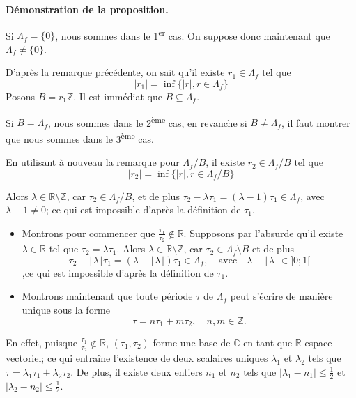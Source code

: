\documentclass{article}
\begin{document}
\textbf{Démonstration de la proposition.}

Si \( \Lambda_f = \{0\} \), nous sommes dans le 1\textsuperscript{er} cas. On suppose donc maintenant que \( \Lambda_f \neq \{0\} \).

D'après la remarque précédente, on sait qu'il existe \( r_1 \in \Lambda_f \) tel que
\[
|r_1| = \inf\{|r|, r \in \Lambda_f\}
\]
Posons \( B = r_1\mathbb{Z} \). Il est immédiat que \( B \subseteq \Lambda_f \).

Si \( B = \Lambda_f \), nous sommes dans le 2\textsuperscript{ème} cas, en revanche si \( B \neq \Lambda_f \), il faut montrer que nous sommes dans le 3\textsuperscript{ème} cas.

En utilisant à nouveau la remarque pour \( \Lambda_f/B \), il existe \( r_2 \in \Lambda_f/B \) tel que
\[
|r_2| = \inf\{|r|, r \in \Lambda_f/B\}
\]

Alors \( \lambda \in \mathbb{R}\setminus\mathbb{Z} \), car \( \tau_2 \in \Lambda_f/B \), et de plus \( \tau_2 - \lambda\tau_1 = (\lambda - 1)\tau_1 \in \Lambda_f \), avec \( \lambda - 1 \neq 0 \); ce qui est impossible d'après la définition de \( \tau_1 \).
\begin{itemize}
    \item Montrons pour commencer que \( \frac{\tau_1}{\tau_2} \notin \mathbb{R} \). Supposons par l'absurde qu'il existe \( \lambda \in \mathbb{R} \) tel que \( \tau_2 = \lambda\tau_1 \).
    Alors \( \lambda \in \mathbb{R} \setminus \mathbb{Z} \), car \( \tau_2 \in \Lambda_f \setminus B \) et de plus  \[
        \tau_2 - \lfloor \lambda \rfloor \tau_1 = (\lambda - \lfloor \lambda \rfloor) \tau_1 \in \Lambda_f, \quad \text{avec} \quad \lambda - \lfloor \lambda \rfloor \in ]0; 1[
        \],ce qui est impossible d'après la définition de \( \tau_1 \).
    
    \item Montrons maintenant que toute période \( \tau \) de \( \Lambda_f \) peut s'écrire de manière unique sous la forme
    \[
    \tau = n\tau_1 + m\tau_2, \quad n, m \in \mathbb{Z}.
    \]
\end{itemize}

En effet, puisque \(\frac{\tau_1}{\tau_2} \notin \mathbb{R}\), \((\tau_1, \tau_2)\) forme une base de \(\mathbb{C}\) en tant que \(\mathbb{R}\) espace vectoriel; ce qui entraîne l'existence de deux scalaires uniques \(\lambda_1\) et \(\lambda_2\) tels que \(\tau = \lambda_1 \tau_1 + \lambda_2 \tau_2\). De plus, il existe deux entiers \(n_1\) et \(n_2\) tels que \(|\lambda_1 - n_1| \leq \frac{1}{2}\) et \(|\lambda_2 - n_2| \leq \frac{1}{2}\).
\end{document}
